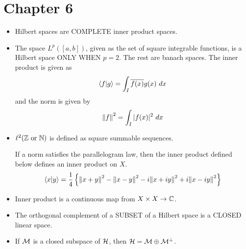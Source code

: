 \section{Chapter 6}
\begin{itemize}
    \item Hilbert spaces are COMPLETE inner product spaces.

\item The space $L^p([a, b])$, given as the set of square integrable functions, is a Hilbert space ONLY WHEN $p = 2$. The rest are banach spaces. The inner product is given as
\[\braket{f}{g} = \int_I \overline{f(x)} g(x) \ dx\]
and the norm is given by 
\[\norm{f}^2 = \int_I |f(x)|^2 \ dx\]

\item $\ell^2(\mathbb{Z} \text{ or } \mathbb{N})$ is defined as square summable sequences. 


If a norm satisfies the parallelogram law, then the inner product defined below defines an inner product on $X$. 
\[\braket{x}{y} = \frac{1}{4}\left\{ \norm{x + y}^2 - \norm{x - y}^2 - i\norm{x + iy}^2 + i\norm{x - iy}^2\right\}\]

\item Inner product is a continuous map from $X \times X \to \mathbb{C}$.

\item The orthogonal complement of a SUBSET of a Hilbert space is a CLOSED linear space. 



\item If $\mathcal{M}$ is a closed subspace of $\mathcal{H}$, then $\mathcal{H} = \mathcal{M} \oplus \mathcal{M}^\perp$.


\end{itemize}

